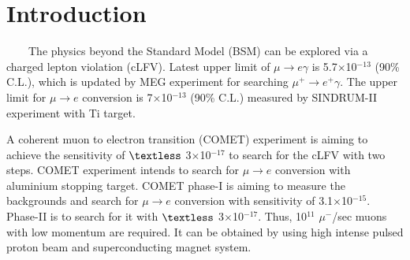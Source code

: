 \documentclass[a4paper, 10pt, twocolumn]{article}
\title{\begin{CJK}{UTF8}{min}\normalsize Radiation study on the Superconducting Solenoid Magnet for $\mu^- \rightarrow e^-$ Conversion Experiment\\
\author{\begin{CJK}{UTF8}{min} ~~~~~~~~~~~~~~~~~~~~~~~~~~~~~~~~~~~~~~~~~~~~~~~~~~~~~~~~~~~~~~~~~~~~~~~~~~~~~~~~~~~~~~~~~~~~~~~~~~~~~~~~~~~~~~~~~~~~~~~~~~~~~                               ~~~$BML(B $B3p(B\end{CJK}}
\date{}
\begin{document}
\maketitle

\section{Introduction}
~~~~The physics beyond the Standard Model (BSM) can be explored via a charged lepton violation (cLFV).
Latest upper limit of $\mu \rightarrow e\gamma$ is 5.7$\times$10$^{-13}$ (90\% C.L.), which is updated by MEG experiment for searching $\mu^+ \rightarrow e^+\gamma$.%
The upper limit for $\mu \rightarrow e$ conversion is 7$\times$10$^{-13}$ (90\% C.L.) measured by SINDRUM-II experiment with Ti target.

A coherent muon to electron transition (COMET) experiment is aiming to achieve the sensitivity of $\textless$ 3$\times$10$^{-17}$ to search for the cLFV with two steps.
COMET experiment intends to search for $\mu \rightarrow e$ conversion with aluminium stopping target.
COMET phase-I is aiming to measure the backgrounds and search for $\mu \rightarrow e$ conversion with sensitivity of 3.1$\times$10$^{-15}$.
Phase-II is to search for it with $\textless$ 3$\times$10$^{-17}$.
Thus, %
10$^{11}$ $\mu^-$/sec muons with low momentum are required.%
It can be obtained by using high intense pulsed proton beam and superconducting magnet system.
\end{document}
